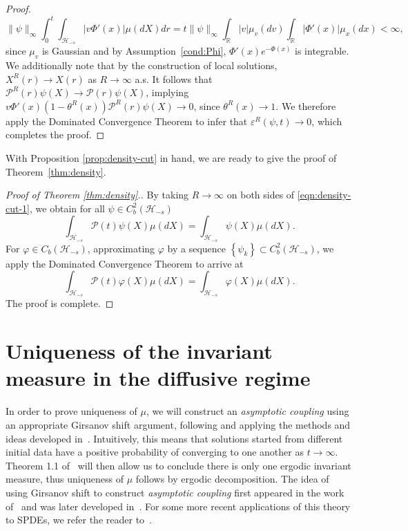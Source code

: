 \documentclass[11pt]{amsart}
\theoremstyle{definition}
\newcommand{\rbb}{\mathbb{R}}
\renewcommand{\H}{\mathcal{H}}
\newcommand{\PMarkov}{\mathcal{P}}
\theoremstyle{definition}
\theoremstyle{plain}
\numberwithin{equation}{section}
\begin{document}
\begin{proof}
\begin{equation*}
\|\psi\|_\infty\int_0^t\int_{\mathcal{H}_{-s}}\!\!\!\!|v\Phi'(x)|\mu(dX)dr=t\|\psi\|_\infty\int_\rbb|v|\mu_v(dv)\int_\rbb\left|\Phi'(x)\right|\mu_x(dx)<\infty,
\end{equation*}
since $\mu_v$ is Gaussian and by Assumption~\ref{cond:Phi}, $\Phi'(x)e^{-\Phi(x)}$ is integrable. We additionally note that by the construction of local solutions, $X^R(r)\to X(r)$ as $R\to\infty$ a.s. It follows that $\PMarkov^R(r)\psi(X)\to\PMarkov(r)\psi(X)$, implying $v\Phi'(x)\left(1-\theta^R(x)\right)\PMarkov^R(r)\psi(X)\to 0$, since $\theta^R(x)\to 1$. We therefore apply the Dominated Convergence Theorem to infer that $\varepsilon^R(\psi,t) \to 0$, which completes the proof.
\end{proof}

With Proposition \ref{prop:density-cut} in hand, we are ready to give the proof of Theorem~\ref{thm:density}.
\begin{proof}[Proof of Theorem \ref{thm:density}.]
By taking $R\to\infty$ on both sides of \eqref{eqn:density-cut-1}, we obtain for all $\psi\in C^2_b(\H_{-s})$
\begin{equation*}\label{eqn:density-9}
\int_{\mathcal{H}_{-s}}\!\!\!\!\PMarkov(t)\psi(X)\mu(dX)=\int_{\mathcal{H}_{-s}}\!\!\!\!\psi(X)\mu(dX).
\end{equation*}
For $\varphi\in C_b(\H_{-s})$, approximating $\varphi$ by a sequence $\left\{\psi_k\right\}\subset C^2_b(\H_{-s})$, we apply the Dominated Convergence Theorem to arrive at
\begin{equation*}\label{eqn:density-9a}
\int_{\mathcal{H}_{-s}}\!\!\!\!\PMarkov(t)\varphi(X)\mu(dX)=\int_{\mathcal{H}_{-s}}\!\!\!\!\varphi(X)\mu(dX).
\end{equation*}
The proof is complete.
\end{proof}




\section{Uniqueness of the invariant measure in the diffusive regime} \label{sec:invariant-unique} 
In order to prove uniqueness of $\mu$, we will construct an {\it asymptotic coupling} using an appropriate Girsanov shift argument, following and applying the methods and ideas developed in~\cite{weinan2001gibbsian,mattingly2002exponential,hairer2011asymptotic}.  Intuitively, this means that solutions started from different initial data have a positive probability of converging to one another as $t\rightarrow \infty$.  Theorem 1.1 of~\cite{hairer2011asymptotic} will then allow us to conclude there is only one ergodic invariant measure, thus uniqueness of $\mu$ follows by ergodic decomposition. The idea of using Girsanov shift to construct \emph{asymptotic coupling} first appeared in the work of~\cite{weinan2001gibbsian} and was later developed in~\cite{hairer2011asymptotic}. For some more recent applications of this theory to SPDEs, we refer the reader to~\cite{glatt2017unique,kulik2015generalized}. 
\end{document}

